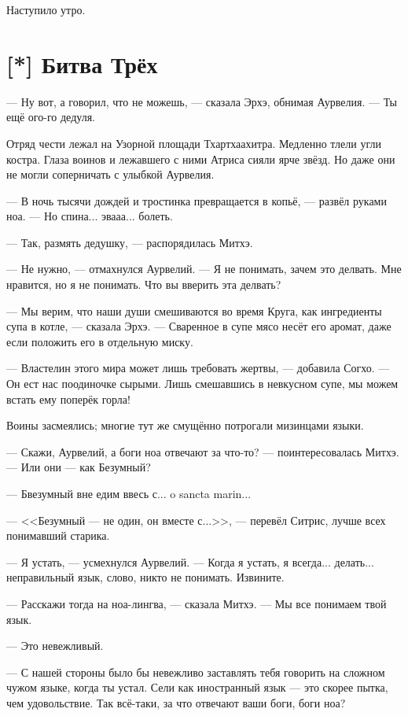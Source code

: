 Наступило утро.

\section{[*] Битва Трёх}

--- Ну вот, а говорил, что не можешь, --- сказала Эрхэ, обнимая Аурвелия.
--- Ты ещё ого-го дедуля.

Отряд чести лежал на Узорной площади Тхартхаахитра.
Медленно тлели угли костра.
Глаза воинов и лежавшего с ними Атриса сияли ярче звёзд.
Но даже они не могли соперничать с улыбкой Аурвелия.

--- В ночь тысячи дождей и тростинка превращается в копьё, --- развёл руками ноа.
--- Но спина... эвааа... болеть.

--- Так, размять дедушку, --- распорядилась Митхэ.

--- Не нужно, --- отмахнулся Аурвелий.
--- Я не понимать, зачем это делвать.
Мне нравится, но я не понимать.
Что вы вверить эта делвать?

--- Мы верим, что наши души смешиваются во время Круга, как ингредиенты супа в котле, --- сказала Эрхэ.
--- Сваренное в супе мясо несёт его аромат, даже если положить его в отдельную миску.

--- Властелин этого мира может лишь требовать жертвы, --- добавила Согхо.
--- Он ест нас поодиночке сырыми.
Лишь смешавшись в невкусном супе, мы можем встать ему поперёк горла!

Воины засмеялись;
многие тут же смущённо потрогали мизинцами языки.

--- Скажи, Аурвелий, а боги ноа отвечают за что-то? --- поинтересовалась Митхэ.
--- Или они --- как Безумный?

--- Бвезумный вне едим ввесь с... o sancta marin...

---  <<Безумный --- не один, он вместе с...>>, --- перевёл Ситрис, лучше всех понимавший старика.

--- Я устать, --- усмехнулся Аурвелий.
--- Когда я устать, я всегда... делать... неправильный язык, слово, никто не понимать.
Извините.

--- Расскажи тогда на ноа-лингва, --- сказала Митхэ.
--- Мы все понимаем твой язык.

--- Это невежливый.

--- С нашей стороны было бы невежливо заставлять тебя говорить на сложном чужом языке, когда ты устал.
Сели как иностранный язык --- это скорее пытка, чем удовольствие.
Так всё-таки, за что отвечают ваши боги, боги ноа?

